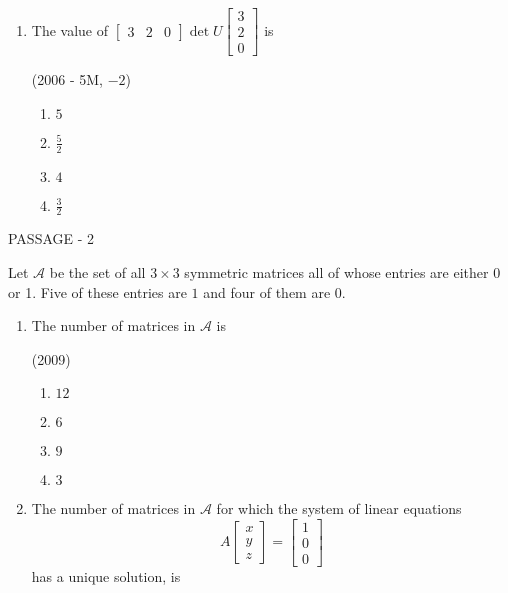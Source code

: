\documentclass[journal,12pt,twocolumn]{IEEEtran}
\theoremstyle{remark}
\begin{document}
\begin{multicols}{2}
\begin{enumerate}
		\item The value of $\begin{bmatrix} 3 & 2 & 0 \end{bmatrix}
				\det{U}
				\begin{bmatrix} 3 \\ 2 \\ 0 \end{bmatrix}$ is

			\hfill(2006 - 5M, $-2$)
			\begin{enumerate}
				\item $5$
				\item $\frac{5}{2}$
				\item $4$
				\item $\frac{3}{2}$
			\end{enumerate}
	\end{enumerate}

	\bigskip

	{\centering PASSAGE - 2 \par}

	\bigskip

	Let $\mathcal{A}$ be the set of all $3\times3$ symmetric matrices all of whose entries are either 0 or 1. Five of these entries are $1$ and four of them are $0$.

	\begin{enumerate}
		\item The number of matrices in $\mathcal{A}$ is

			\hfill(2009)

			\begin{enumerate}
				\item $12$
				\item $6$
				\item $9$
				\item $3$
			\end{enumerate}

		\pagebreak

		\item The number of matrices in $\mathcal{A}$ for which the system of linear equations
			$$A\begin{bmatrix}x \\ y \\ z \end{bmatrix} = \begin{bmatrix} 1 \\ 0 \\ 0 \end{bmatrix}$$
			has a unique solution, is


\end{enumerate}
\end{multicols}
\end{document}
